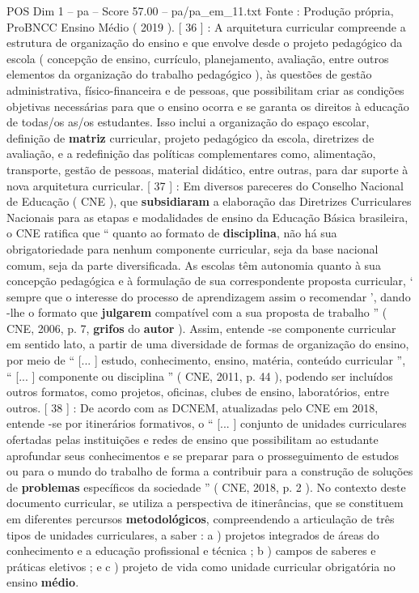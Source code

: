 \begin{textsample}{POS Dim 1 – pa – Score 57.00 – pa/pa\_em\_11.txt}
Fonte : Produção própria, ProBNCC Ensino Médio ( 2019 ). [ 36 ] : A arquitetura curricular compreende a estrutura de organização do ensino e que envolve desde o projeto pedagógico da escola ( concepção de ensino, currículo, planejamento, avaliação, entre outros elementos da organização do trabalho pedagógico ), às questões de gestão administrativa, físico-financeira e de pessoas, que possibilitam criar as condições objetivas necessárias para que o ensino ocorra e se garanta os direitos à educação de todas/os as/os estudantes.
Isso inclui a organização do espaço escolar, definição de \textbf{matriz} curricular, projeto pedagógico da escola, diretrizes de avaliação, e a redefinição das políticas complementares como, alimentação, transporte, gestão de pessoas, material didático, entre outras, para dar suporte à nova arquitetura curricular. [ 37 ] : Em diversos pareceres do Conselho Nacional de Educação ( CNE ), que \textbf{subsidiaram} a elaboração das Diretrizes Curriculares Nacionais para as etapas e modalidades de ensino da Educação Básica brasileira, o CNE ratifica que “ quanto ao formato de \textbf{disciplina}, não há sua obrigatoriedade para nenhum componente curricular, seja da base nacional comum, seja da parte diversificada.
As escolas têm autonomia quanto à sua concepção pedagógica e à formulação de sua correspondente proposta curricular, ‘ sempre que o interesse do processo de aprendizagem assim o recomendar ’, dando -lhe o formato que \textbf{julgarem} compatível com a sua proposta de trabalho ” ( CNE, 2006, p. 7, \textbf{grifos} do \textbf{autor} ).
Assim, entende -se componente curricular em sentido lato, a partir de uma diversidade de formas de organização do ensino, por meio de “ [... ] estudo, conhecimento, ensino, matéria, conteúdo curricular ”, “ [... ] componente ou disciplina ” ( CNE, 2011, p. 44 ), podendo ser incluídos outros formatos, como projetos, oficinas, clubes de ensino, laboratórios, entre outros. [ 38 ] : De acordo com as DCNEM, atualizadas pelo CNE em 2018, entende -se por itinerários formativos, o “ [... ] conjunto de unidades curriculares ofertadas pelas instituições e redes de ensino que possibilitam ao estudante aprofundar seus conhecimentos e se preparar para o prosseguimento de estudos ou para o mundo do trabalho de forma a contribuir para a construção de soluções de \textbf{problemas} específicos da sociedade ” ( CNE, 2018, p. 2 ).
No contexto deste documento curricular, se utiliza a perspectiva de itinerâncias, que se constituem em diferentes percursos \textbf{metodológicos}, compreendendo a articulação de três tipos de unidades curriculares, a saber : a ) projetos integrados de áreas do conhecimento e a educação profissional e técnica ; b ) campos de saberes e práticas eletivos ; e c ) projeto de vida como unidade curricular obrigatória no ensino \textbf{médio}.

\end{textsample}
